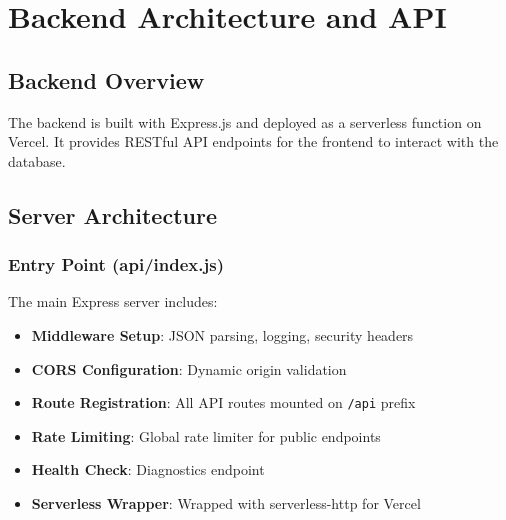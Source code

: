 \documentclass[12pt,a4paper]{report}
\begin{document}
\begin{center}
\end{center}

\newpage

\chapter{Backend Architecture and API}

\section{Backend Overview}

The backend is built with Express.js and deployed as a serverless function on Vercel. It provides RESTful API endpoints for the frontend to interact with the database.

\section{Server Architecture}

\subsection{Entry Point (api/index.js)}

The main Express server includes:

\begin{itemize}
    \item \textbf{Middleware Setup}: JSON parsing, logging, security headers
    \item \textbf{CORS Configuration}: Dynamic origin validation
    \item \textbf{Route Registration}: All API routes mounted on \texttt{/api} prefix
    \item \textbf{Rate Limiting}: Global rate limiter for public endpoints
    \item \textbf{Health Check}: Diagnostics endpoint
    \item \textbf{Serverless Wrapper}: Wrapped with serverless-http for Vercel
\end{itemize}
\end{document}
